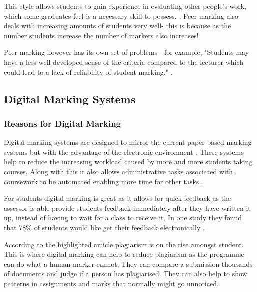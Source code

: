 \documentclass[12pt]{article}  %
\begin{document}
This style allows  students to gain experience in evaluating other people's work, which some graduates feel is a necessary skill to possess. \cite{langan_insights_????}. Peer marking also deals with increasing amounts of students very well- this is because as the number students increase the number of markers also increases!

Peer marking however has its own set of problems - for example, "Students may have a less well developed sense of the criteria compared to the lecturer which could lead to a lack of reliability of student marking." \cite{orsmond_use_2000}.



\subsection{Digital Marking Systems}

\subsubsection{Reasons for Digital Marking}
Digital marking systems are designed to mirror the current paper based marking systems but with the advantage of the electronic environment \cite{heinrich_online_2003}. These systems help to reduce the increasing workload caused by more and more students taking courses. Along with this it also allows administrative tasks associated with coursework to be automated enabling more time for other tasks.\cite{joy_effective_1998}.

For students digital marking is great as it allows for quick feedback as the assessor is able provide students feedback immediately after they have written it up, instead of having to wait for a class to receive it. In one study\cite{dahl_turnitin_2007} they found that 78\% of students would like get their feedback  electronically .

According to the highlighted article \cite{derby_duplication_2008} plagiarism is on the rise amongst student. This is where digital marking can help to reduce plagiarism as the programme can  do what a human marker cannot. They can compare a submission thousands of documents and judge if a person has plagiarised. They can also help to show patterns in assignments and marks that normally might go unnoticed.


\newpage
\end{document}
